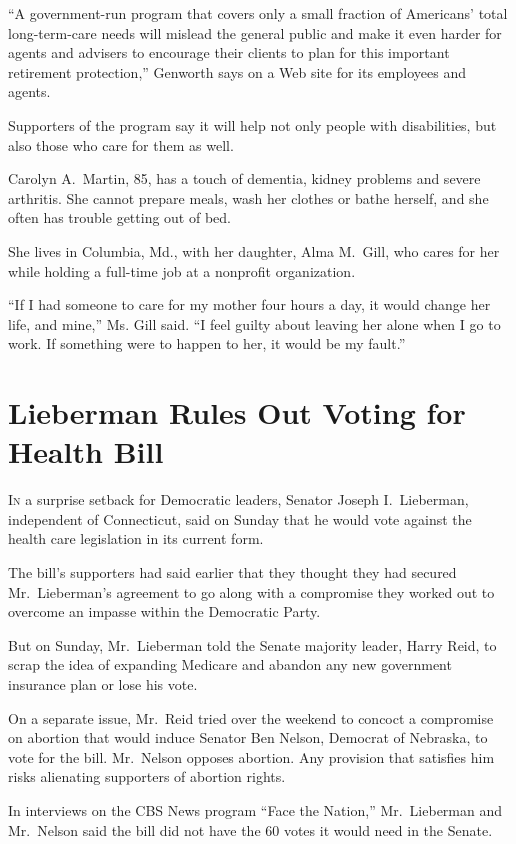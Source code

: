 ﻿\documentclass[12pt]{article}
\begin{document}
``A government-run program that covers only a small fraction of Americans' total long-term-care
needs will mislead the general public and make it even harder for agents and advisers to encourage
their clients to plan for this important retirement protection,'' Genworth says on a Web site for
its employees and agents.

Supporters of the program say it will help not only people with disabilities, but also those who
care for them as well.

Carolyn A.~Martin, 85, has a touch of dementia, kidney problems and severe arthritis. She cannot
prepare meals, wash her clothes or bathe herself, and she often has trouble getting out of bed.

She lives in Columbia, Md., with her daughter, Alma M.~Gill, who cares for her while holding a
full-time job at a nonprofit organization.

``If I had someone to care for my mother four hours a day, it would change her life, and mine,'' Ms.
Gill said. ``I feel guilty about leaving her alone when I go to work. If something were to happen to
her, it would be my fault.''

\section{Lieberman Rules Out Voting for Health Bill}

\lettrine{I}{n} a surprise setback for Democratic leaders, Senator Joseph
I.~Lieberman, independent of Connecticut, said on Sunday that he would vote against the health care
legislation in its current form.

The bill's supporters had said earlier that they thought they had secured Mr.~Lieberman's agreement
to go along with a compromise they worked out to overcome an impasse within the Democratic Party.

But on Sunday, Mr.~Lieberman told the Senate majority leader, Harry Reid, to scrap the idea of
expanding Medicare and abandon any new government insurance plan or lose his vote.

On a separate issue, Mr.~Reid tried over the weekend to concoct a compromise on abortion that would
induce Senator Ben Nelson, Democrat of Nebraska, to vote for the bill. Mr.~Nelson opposes abortion.
Any provision that satisfies him risks alienating supporters of abortion rights.

In interviews on the CBS News program ``Face the Nation,'' Mr.~Lieberman and Mr.~Nelson said the
bill did not have the 60 votes it would need in the Senate.
\end{document}
